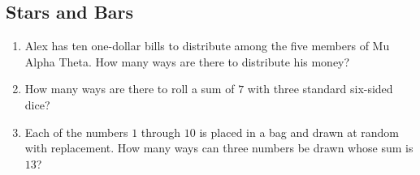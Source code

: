 \documentclass[twocolumn]{article}
\begin{document}
\subsection*{Stars and Bars}
\begin{enumerate}[resume]
	\item Alex has ten one-dollar bills to distribute among the five members of 
		Mu Alpha Theta. How many ways are there to distribute his money?
		\vspace{3cm}
	\item How many ways are there to roll a sum of $7$ with three standard 
		six-sided dice?
		\vspace{3cm}
	\item Each of the numbers $1$ through $10$ is placed in a bag and drawn at 
		random with replacement. How many ways can three numbers be drawn whose 
		sum is $13$?
		\vspace{3cm}
\end{enumerate}
\end{document}
